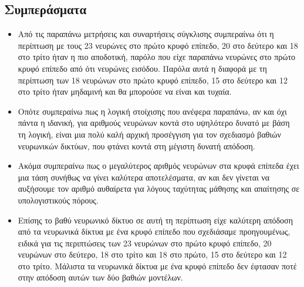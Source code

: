 \documentclass[12pt,a4paper]{article}
\begin{document}
\subsection{Συμπεράσματα}
\begin{itemize}
    \item Από τις παραπάνω μετρήσεις και συναρτήσεις σύγκλισης συμπεραίνω ότι η περίπτωση με τους 23 νευρώνες στο πρώτο κρυφό επίπεδο, 20 στο δεύτερο και 18 στο τρίτο ήταν η πιο αποδοτική, παρόλο που είχε παραπάνω νευρώνες στο πρώτο κρυφό επίπεδο από ότι νευρώνες εισόδου. Παρόλα αυτά η διαφορά με τη περίπτωση των 18 νευρώνων στο πρώτο κρυφό επίπεδο, 15 στο δεύτερο και 12 στο τρίτο ήταν μηδαμινή και θα μπορούσε να είναι και τυχαία.
    \item Οπότε συμπεραίνω πως η λογική στοίχισης που ανέφερα παραπάνω, αν και όχι πάντα η ιδανική, για αριθμούς νευρώνων κοντά στο υψηλότερο δυνατό με βάση τη λογική, είναι μια πολύ καλή αρχική προσέγγιση για τον σχεδιασμό βαθιών νευρωνικών δικτύων, που φτάνει κοντά στη μέγιστη δυνατή απόδοση.
    \item Ακόμα συμπεραίνω πως ο μεγαλύτερος αριθμός νευρώνων στα κρυφά επίπεδα έχει μια τάση συνήθως να γίνει καλύτερα αποτελέσματα, αν και δεν γίνεται να αυξήσουμε τον αριθμό αυθαίρετα για λόγους ταχύτητας μάθησης και απαίτησης σε υπολογιστικούς πόρους.
    \item Επίσης το βαθύ νευρωνικό δίκτυο σε αυτή τη περίπτωση είχε καλύτερη απόδοση από τα νευρωνικά δίκτυα με ένα κρυφό επίπεδο που σχεδιάσαμε προηγουμένως, ειδικά για τις περιπτώσεις των 23 νευρώνων στο πρώτο κρυφό επίπεδο, 20 νευρώνων στο δεύτερο, 18 στο τρίτο και 18 στο πρώτο, 15 στο δεύτερο και 12 στο τρίτο. Μάλιστα τα νευρωνικά δίκτυα με ένα κρυφό επίπεδο δεν έφτασαν ποτέ στην απόδοση αυτών των δύο βαθιών μοντέλων.
\end{itemize}
\end{document}
